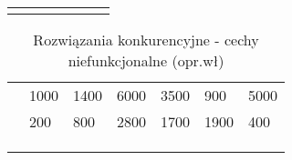 \begin{minipage}{\textwidth}
\begin{table}[H]
\begin{tabular}{|P{.22\textwidth}|P{.09\textwidth}|P{.09\textwidth}|P{.09\textwidth}|P{.09\textwidth}|P{.09\textwidth}|P{.09\textwidth}|}
                    &        &            &           &             &        &      \\ \hline
                    &        &            &           &             &        &      \\ \hline
        \end{tabular}
    \end{table}
\end{minipage}

\begin{minipage}{\textwidth}
    \begin{table}[H]
        \centering\caption{Rozwiązania konkurencyjne - cechy niefunkcjonalne (opr.wł)\label{tabela:rozwiazania-konkurencyjne-niefunkcjonalne}}
        \begin{tabular}{|P{.22\textwidth}|P{.09\textwidth}|P{.09\textwidth}|P{.09\textwidth}|P{.09\textwidth}|P{.09\textwidth}|P{.09\textwidth}|}
            \hline
                                                            &    &    &  &          &    &    \\ \hline
                        & 1000      & 1400          & 6000         & 3500           & 900       & 5000    \\ \hline
                       & 200       & 800           & 2800         & 1700           & 1900      & 400     \\ \hline
                                   &        &            &           &             &        &      \\ \hline
                                    &        &            &           &             &        &      \\ \hline
                 &        &            &           &             &        &      \\ \hline

\end{tabular}
\end{table}
\end{minipage}
